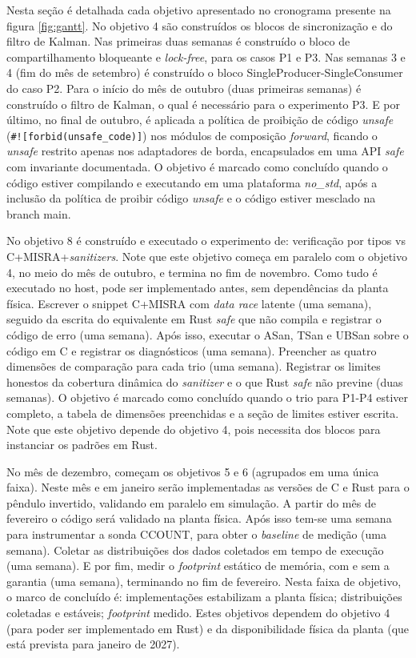 Nesta seção é detalhada cada objetivo apresentado no cronograma presente na figura \ref{fig:gantt}. No objetivo 4 são construídos os blocos de sincronização e do filtro de Kalman. Nas primeiras duas semanas é construído o bloco de compartilhamento bloqueante e \textit{lock-free}, para os casos P1 e P3. Nas semanas 3 e 4 (fim do mês de setembro) é construído o bloco SingleProducer-SingleConsumer do caso P2. Para o início do mês de outubro (duas primeiras semanas) é construído o filtro de Kalman, o qual é necessário para o experimento P3. E por último, no final de outubro, é aplicada a política de proibição de código \textit{unsafe} (\texttt{\#![forbid(unsafe\_code)]}) nos módulos de composição \textit{forward}, ficando o \textit{unsafe} restrito apenas nos adaptadores de borda, encapsulados em uma \ac{API} \textit{safe} com invariante documentada. O objetivo é marcado como concluído quando o código estiver compilando e executando em uma plataforma \textit{no\_std}, após a inclusão da política de proibir código \textit{unsafe} e o código estiver mesclado na branch main.

No objetivo 8 é construído e executado o experimento de: verificação por tipos vs C+\allowbreak \ac{MISRA}+\allowbreak \textit{sanitizers}. Note que este objetivo começa em paralelo com o objetivo 4, no meio do mês de outubro, e termina no fim de novembro. Como tudo é executado no host, pode ser implementado antes, sem dependências da planta física. Escrever o snippet C+\allowbreak \ac{MISRA} com \textit{data race} latente (uma semana), seguido da escrita do equivalente em Rust \textit{safe} que não compila e registrar o código de erro (uma semana). Após isso, executar o \ac{ASan}, \ac{TSan} e \ac{UBSan} sobre o código em C e registrar os diagnósticos (uma semana). Preencher as quatro dimensões de comparação para cada trio (uma semana). Registrar os limites honestos da cobertura dinâmica do \textit{sanitizer} e o que Rust \textit{safe} não previne (duas semanas). O objetivo é marcado como concluído quando o trio para P1-P4 estiver completo, a tabela de dimensões preenchidas e a seção de limites estiver escrita. Note que este objetivo depende do objetivo 4, pois necessita dos blocos para instanciar os padrões em Rust.

No mês de dezembro, começam os objetivos 5 e 6 (agrupados em uma única faixa). Neste mês e em janeiro serão implementadas as versões de C e Rust para o pêndulo invertido, validando em paralelo em simulação. A partir do mês de fevereiro o código será validado na planta física. Após isso tem-se uma semana para instrumentar a sonda CCOUNT, para obter o \textit{baseline} de medição (uma semana). Coletar as distribuições dos dados coletados em tempo de execução (uma semana). E por fim, medir o \textit{footprint} estático de memória, com e sem a garantia (uma semana), terminando no fim de fevereiro. Nesta faixa de objetivo, o marco de concluído é: implementações estabilizam a planta física; distribuições coletadas e estáveis; \textit{footprint} medido. Estes objetivos dependem do objetivo 4 (para poder ser implementado em Rust) e da disponibilidade física da planta (que está prevista para janeiro de 2027).


